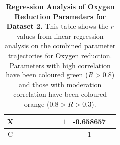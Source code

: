 \begin{table}[p]
{\begin{minipage}{24.4cm}
\begin{tabular}{|c|c|c|c|c|c|c|c|c|c|}
    \hline
    \cellcolor{dark-gray}X & \cellcolor{light-gray} & \cellcolor{light-gray} & \cellcolor{light-gray} & \cellcolor{light-gray} & \cellcolor{light-gray} & \cellcolor{light-gray} & \cellcolor{light-gray}$1$ & \cellcolor{orange}-0.658657 \\
    \hline
    \cellcolor{dark-gray}C & \cellcolor{light-gray} & \cellcolor{light-gray} & \cellcolor{light-gray} & \cellcolor{light-gray} & \cellcolor{light-gray} & \cellcolor{light-gray} & \cellcolor{light-gray} & \cellcolor{light-gray}$1$ \\
    \hline
  \end{tabular}
  \caption[Regression Analysis of Oxygen Reduction Parameters]{{\bf Regression Analysis of Oxygen Reduction Parameters for Dataset 2.} This table shows the $r$ values from linear regression analysis on the combined parameter trajectories for Oxygen reduction. Parameters with high correlation have been coloured green ($R>0.8$) and those with moderation correlation have been coloured orange ($0.8>R>0.3$).
  \label{tab:oxyregress1}}
  \end{minipage}
  }
\end{table}
\afterpage{\clearpage}
